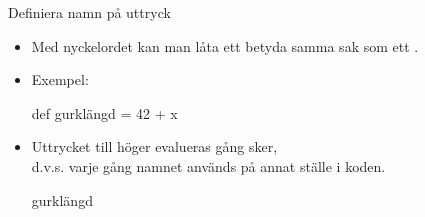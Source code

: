 

\begin{Slide}{Definiera namn på uttryck}
\begin{itemize}
\item Med nyckelordet  kan man låta ett  betyda samma sak som ett .
\item Exempel:
\begin{Code}
def gurklängd = 42 + x
\end{Code}
\item Uttrycket till höger evalueras  gång  sker,\\
d.v.s. varje gång namnet används på annat ställe i koden.
\begin{Code}
gurklängd
\end{Code}

\end{itemize}
\end{Slide}

